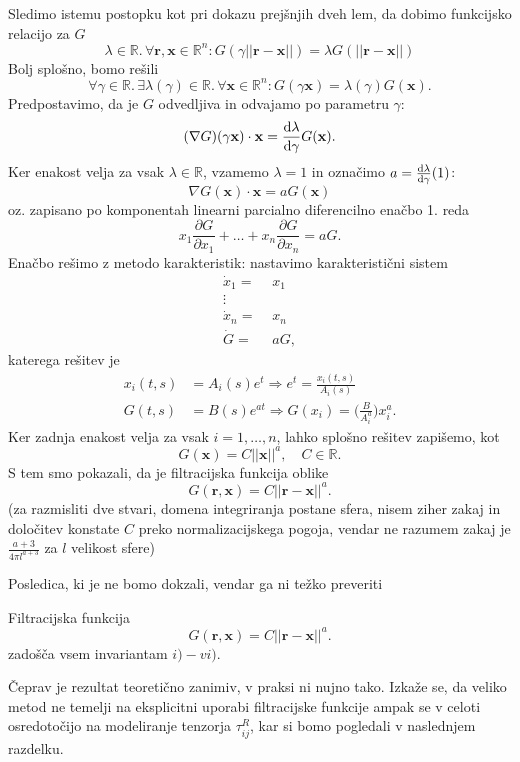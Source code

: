\documentclass[mat2, tisk]{fmfdelo}
\newcommand{\R}{\mathbb R}
\newcommand{\bd}{\textbf}
\begin{document}
\begin{dokaz}
Sledimo istemu postopku kot pri dokazu prejšnjih dveh lem, da dobimo funkcijsko relacijo za $G$
$$
\lambda\in \R.\, \forall\bd{r}, \bd{x}\in \R^n: G(\gamma||\bd{r} - \bd{x}||) = \lambda G(||\bd{r} - \bd{x}||)
$$
Bolj splošno, bomo rešili 
$$
\forall \gamma\in \R.\, \exists \lambda(\gamma)\in \R.\, \forall \bd{x}\in \R^n: G(\gamma \bd{x}) = \lambda(\gamma) G(\bd{x}).
$$
Predpostavimo, da je $G$ odvedljiva in odvajamo po parametru $\gamma$:
$$
(\nabla G)(\gamma \bd{x}) \cdot \bd{x} = \frac{\dif \lambda}{\dif \gamma} G(\bd{x}).
$$
Ker enakost velja za vsak $\lambda \in \R$, vzamemo $\lambda = 1$ in označimo $a = \frac{\dif \lambda}{\dif \gamma}(1)$:
$$
\nabla G(\bd{x}) \cdot \bd{x} = a G(\bd{x})
$$
oz. zapisano po komponentah linearni parcialno diferencilno enačbo 1. reda
$$
x_1\frac{\partial G}{\partial x_1} + \dots + x_n\frac{\partial G}{\partial x_n} = aG.
$$
Enačbo rešimo z metodo karakteristik: nastavimo karakteristični sistem 
\begin{align*}
\dot{x}_1 =&\,\, x_1 \\
\!\!\!\!\vdots \\
\dot{x}_n = &\,\, x_n \\
\dot{G} =&\,\, aG,
\end{align*}
katerega rešitev je 
\begin{align*}
x_i(t, s) &= A_i(s) e^t \Longrightarrow e^t = \frac{x_i(t, s)}{A_i(s)}\\
G(t, s) &= B(s) e^{at} \Longrightarrow G(x_i) = \Big(\frac{B}{A_i^a}\Big) x_i^a.
\end{align*}
Ker zadnja enakost velja za vsak $i=1,\dots, n$, lahko splošno rešitev zapišemo, kot 
$$
G(\bd{x}) = C ||\bd{x}||^a, \quad C\in \R.
$$
S tem smo pokazali, da je filtracijska funkcija oblike 
$$
G(\bd{r}, \bd{x}) = C||\bd{r} - \bd{x}||^a.
$$
(za razmisliti dve stvari, domena integriranja postane sfera, nisem ziher zakaj in 
določitev konstate $C$ preko normalizacijskega pogoja, vendar ne razumem zakaj je $\frac{a+3}{4\pi l^{a+3}} $
za $l$ velikost sfere)
\end{dokaz}

Posledica, ki je ne bomo dokzali, vendar ga ni težko preveriti

\begin{posledica}
Filtracijska funkcija 
$$
G(\bd{r}, \bd{x}) = C||\bd{r} - \bd{x}||^a.
$$
zadošča vsem invariantam $i) - vi)$.
\end{posledica}

Čeprav je rezultat teoretično zanimiv, v praksi ni nujno tako. Izkaže se, da veliko 
metod ne temelji na eksplicitni uporabi filtracijske funkcije ampak se v celoti osredotočijo 
na modeliranje tenzorja $\tau_{ij}^R$, kar si bomo pogledali v naslednjem razdelku. 
\end{document}

